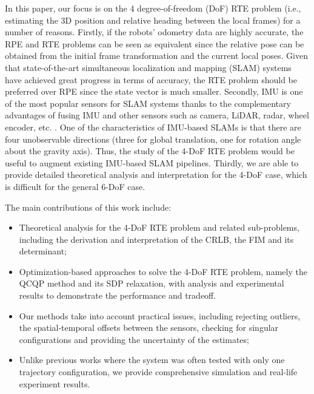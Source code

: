 \documentclass[journal]{IEEEtran}
\begin{document}
In this paper, our focus is on the 4 degree-of-freedom (DoF) RTE problem (i.e., estimating the 3D position and relative heading between the local frames) for a number of reasons. Firstly, if the robots' odometry data are highly accurate, the RPE and RTE problems can be seen as equivalent since the relative pose can be obtained from the initial frame transformation and the current local poses. Given that state-of-the-art simultaneous localization and mapping (SLAM) systems have achieved great progress in terms of accuracy\cite{shenghai2021ussurvey,nguyen2022viralfusion}, the RTE problem should be preferred over RPE since the state vector is much smaller. Secondly, IMU is one of the most popular sensors for SLAM systems thanks to the complementary advantages of fusing IMU and other sensors such as camera, LiDAR, radar, wheel encoder, etc. \cite{mohamed2019odomsurvey}. One of the characteristics of IMU-based SLAMs is that there are four unobservable directions \cite{huang2019visual} (three for global translation, one for rotation angle about the gravity axis). Thus, the study of the 4-DoF RTE problem would be useful to augment existing IMU-based SLAM pipelines. Thirdly, we are able to provide detailed theoretical analysis and interpretation for the 4-DoF case, which is difficult for the general 6-DoF case.

The main contributions of this work include:

\begin{itemize}

\item Theoretical analysis for the 4-DoF RTE problem and related sub-problems, including the derivation and interpretation of the CRLB, the FIM and its determinant;

\item Optimization-based approaches to solve the 4-DoF RTE problem, namely the QCQP method and its SDP relaxation, with analysis and experimental results to demonstrate the performance and tradeoff.

\item Our methods take into account practical issues, including rejecting outliers, the spatial-temporal offsets between the sensors, checking for singular configurations and providing the uncertainty of the estimates;

\item Unlike previous works where the system was often tested with only one trajectory configuration, we provide comprehensive simulation and real-life experiment results.

\end{itemize}
\end{document}

